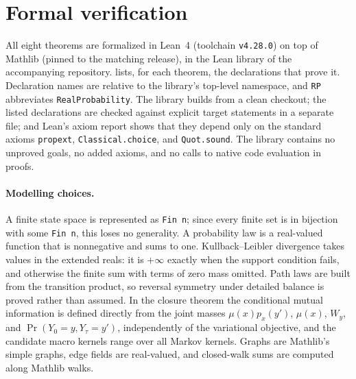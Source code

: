 \section{Formal verification}\label{app:formalization}

All eight theorems are formalized in Lean~4 (toolchain \texttt{v4.28.0}) on top of Mathlib (pinned to the matching release), in the Lean library of the accompanying repository.
 lists, for each theorem, the declarations that prove it.
Declaration names are relative to the library's top-level namespace, and \texttt{RP} abbreviates \texttt{RealProbability}.
The library builds from a clean checkout; the listed declarations are checked against explicit target statements in a separate file; and Lean's axiom report shows that they depend only on the standard axioms \texttt{propext}, \texttt{Classical.choice}, and \texttt{Quot.sound}.
The library contains no unproved goals, no added axioms, and no calls to native code evaluation in proofs.

\paragraph{Modelling choices.}
A finite state space is represented as \texttt{Fin n}; since every finite set is in bijection with some \texttt{Fin n}, this loses no generality.
A probability law is a real-valued function that is nonnegative and sums to one.
Kullback--Leibler divergence takes values in the extended reals: it is $+\infty$ exactly when the support condition fails, and otherwise the finite sum with terms of zero mass omitted.
Path laws are built from the transition product, so reversal symmetry under detailed balance is proved rather than assumed.
In the closure theorem the conditional mutual information is defined directly from the joint masses $\mu(x)p_x(y')$, $\mu(x)$, $W_y$, and $\Pr(Y_0=y,Y_\tau=y')$, independently of the variational objective, and the candidate macro kernels range over all Markov kernels.
Graphs are Mathlib's simple graphs, edge fields are real-valued, and closed-walk sums are computed along Mathlib walks.

